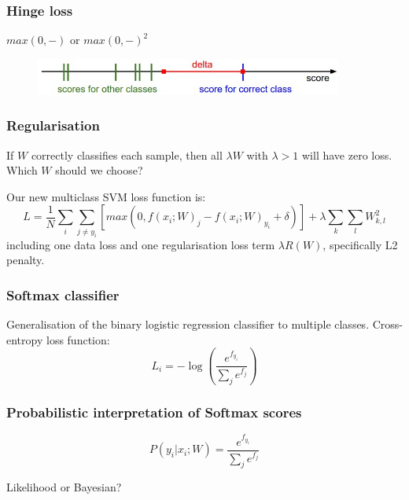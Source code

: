\begin{frame}
        \frametitle{Hinge loss}

	$max(0,-)$ or $max(0,-)^2$

	\centering
	\begin{figure}
      		\includegraphics[width=0.9\textwidth]{Pics/margin.jpg}
     	\end{figure}
 
\end{frame}

\begin{frame}
	\frametitle{Regularisation}

	If $W$ correctly classifies each sample, then all $\lambda W$ with $\lambda>1$ will have zero loss.\\
	\vskip 0.2cm
	Which $W$ should we choose?

	\vskip 0.5cm

	\pause
	
	Our new multiclass SVM loss function is:
	\begin{equation*}
                L = \frac{1}{N} \sum_i \sum_{j \neq y_i} [max (0, f(x_i; W)_j - f(x_i; W)_{y_i} + \delta)] + \lambda \sum_k \sum_l W^2_{k,l}
        \end{equation*}
	including one data loss and one regularisation loss term $\lambda R(W)$, specifically L2 penalty.

\end{frame}

\begin{frame}
	\frametitle{Softmax classifier}

	Generalisation of the binary logistic regression classifier to multiple classes.
	\vskip 0.5cm
	Cross-entropy loss function:
	\begin{equation*}
		L_i = -\log ( \frac{ e^{f_{y_i}}} {\sum_j e^{f_j}} )
	\end{equation*}
	
\end{frame}

\begin{frame}
	\frametitle{Probabilistic interpretation of Softmax scores}

	\begin{equation*}
      		P(y_i | x_i; W) = \frac{ e^{f_{y_i}}} {\sum_j e^{f_j}}
        \end{equation*}

	Likelihood or Bayesian?

\end{frame}

